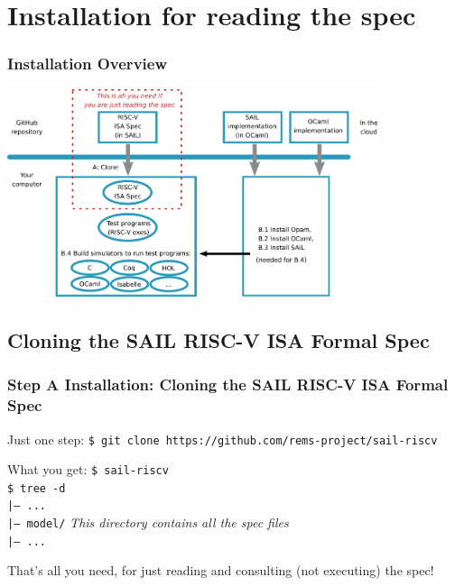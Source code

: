 \documentclass[aspectratio=169]{beamer}
\newcommand{\hm}{\hspace*{1em}}
\newcommand{\scripttt}{\scriptsize\tt}
\begin{document}

\section{Installation for reading the spec}

\begin{frame}
  \frametitle{Installation Overview}

  \centering
  \includegraphics[height=2.4in]{Figures/Fig_Installation_Overview.png}
\end{frame}



\subsection{Cloning the SAIL RISC-V ISA Formal Spec}

\begin{frame}
  \frametitle{Step A Installation: Cloning the SAIL RISC-V ISA Formal Spec}

  \begin{block}{Just one step:}
    {\scripttt\hm{}\$ git clone https://github.com/rems-project/sail-riscv}
  \end{block}

  \begin{block}{What you get:}
    {\scripttt\hm{}\$ sail-riscv} \\
    {\scripttt\hm{}\$ tree -d} \\
    {\scripttt\hm{}|-- ...} \\
    {\scripttt\hm{}|-- model/} \hspace{5em} \emph{This directory contains all the spec files}\\
    {\scripttt\hm{}|-- ...} \\
  \end{block}

  That's all you need, for just reading and consulting (not executing) the spec!

\end{frame}
\end{document}
